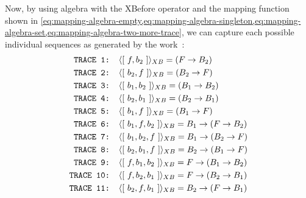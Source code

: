 \documentclass[12pt,openright,twoside,a4paper,oldfontcommands,english,brazil,final]{abntex2}
\theoremstyle{theo}
\def\xbeforeop{\ensuremath\rightarrow}
\newcommand{\xbefore}[2]{\ensuremath #1 \xbeforeop #2 }
\newcommand{\tracetoalgebra}[1]{\ensuremath\langle{#1}\rangle_{XB}}
\newcommand{\trace}[1]{\ensuremath\left[~#1~\right]}
\newcommand{\parsin}[1]{\ensuremath\left( #1 \right)}
\begin{document}
Now, by using \ac{algebra} with the \ac{XBefore} operator and the mapping function shown in \cref{eq:mapping-algebra-empty,eq:mapping-algebra-singleton,eq:mapping-algebra-set,eq:mapping-algebra-two-more-trace}, we can capture each possible individual sequences as generated by the work~\cite{DM2012}:
%
\begin{align*}
\text{\texttt{TRACE 1: }}&\tracetoalgebra{\trace{f,b_2}} = \parsin{\xbefore{F}{B_2}}\\
\text{\texttt{TRACE 2: }}&\tracetoalgebra{\trace{b_2,f}} = \parsin{\xbefore{B_2}{F}}\\
\text{\texttt{TRACE 3: }}&\tracetoalgebra{\trace{b_1,b_2}} = \parsin{\xbefore{B_1}{B_2}}\\
\text{\texttt{TRACE 4: }}&\tracetoalgebra{\trace{b_2,b_1}} = \parsin{\xbefore{B_2}{B_1}}\\
\text{\texttt{TRACE 5: }}&\tracetoalgebra{\trace{b_1,f}} = \parsin{\xbefore{B_1}{F}}\\
\text{\texttt{TRACE 6: }}&\tracetoalgebra{\trace{b_1,f,b_2}} = 
  \xbefore{B_1}{\left(\xbefore{F}{B_2}\right)} \\
\text{\texttt{TRACE 7: }}&\tracetoalgebra{\trace{b_1,b_2,f}} = 
  \xbefore{B_1}{\left(\xbefore{B_2}{F}\right)} \\
\text{\texttt{TRACE 8: }}&\tracetoalgebra{\trace{b_2,b_1,f}} = 
  \xbefore{B_2}{\left(\xbefore{B_1}{F}\right)} \\
\text{\texttt{TRACE 9: }}&\tracetoalgebra{\trace{f,b_1,b_2}} = 
  \xbefore{F}{\left(\xbefore{B_1}{B_2}\right)} \\
\text{\texttt{TRACE 10: }}&\tracetoalgebra{\trace{f,b_2,b_1}} = 
  \xbefore{F}{\left(\xbefore{B_2}{B_1}\right)} \\
\text{\texttt{TRACE 11: }}&\tracetoalgebra{\trace{b_2,f,b_1}} = 
  \xbefore{B_2}{\left(\xbefore{F}{B_1}\right)} 
\end{align*}
\end{document}
